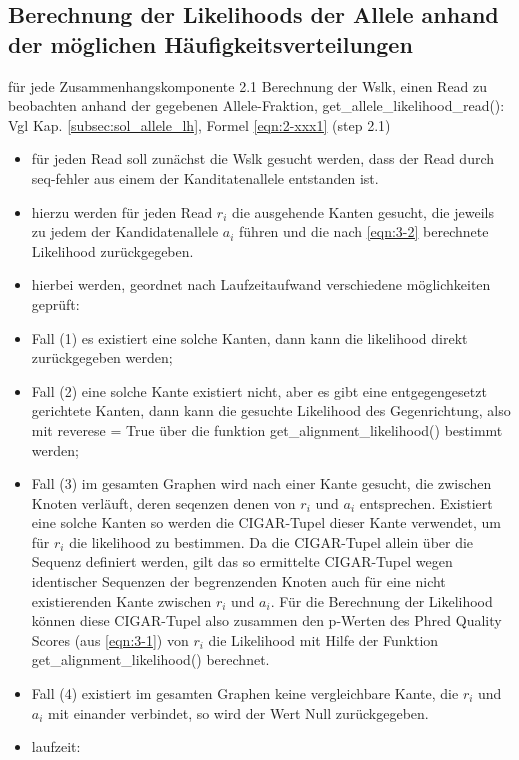\subsection{Berechnung der Likelihoods der Allele anhand der möglichen Häufigkeitsverteilungen} \label{subsec:lh_allele}
für jede Zusammenhangskomponente
2.1 Berechnung der Wslk, einen Read zu beobachten anhand der gegebenen Allele-Fraktion, get\_allele\_likelihood\_read(): Vgl Kap. \ref{subsec:sol_allele_lh}, Formel  \eqref{eqn:2-xxx1} (step 2.1)
\begin{itemize}
	\item für jeden Read soll zunächst die Wslk gesucht werden, dass der Read durch seq-fehler aus einem der Kanditatenallele entstanden ist. 
	\item hierzu werden für jeden Read $ r_{i} $ die ausgehende Kanten gesucht, die jeweils zu jedem der Kandidatenallele $ a_{i} $ führen und die nach \eqref{eqn:3-2} berechnete Likelihood zurückgegeben.
	\item hierbei werden, geordnet nach Laufzeitaufwand verschiedene möglichkeiten geprüft: 
	\item Fall (1) es existiert eine solche Kanten, dann kann die likelihood direkt zurückgegeben werden; 
	\item Fall (2) eine solche Kante existiert nicht, aber es gibt eine entgegengesetzt gerichtete Kanten, dann kann die gesuchte Likelihood des Gegenrichtung, also mit reverese = True über die funktion get\_alignment\_likelihood() bestimmt werden; 
	\item Fall (3) im gesamten Graphen wird nach einer Kante gesucht, die zwischen Knoten verläuft, deren seqenzen denen von $ r_{i} $ und $ a_{i} $ entsprechen. Existiert eine solche Kanten so werden die CIGAR-Tupel dieser Kante verwendet, um für $ r_{i} $ die likelihood zu bestimmen. Da die CIGAR-Tupel allein über die Sequenz definiert werden, gilt das so ermittelte CIGAR-Tupel wegen identischer Sequenzen der begrenzenden Knoten auch für eine nicht existierenden Kante zwischen $ r_{i} $ und $ a_{i} $. Für die Berechnung der Likelihood können diese CIGAR-Tupel also zusammen den p-Werten des Phred Quality Scores (aus \eqref{eqn:3-1}) von $ r_{i} $ die Likelihood mit Hilfe der Funktion get\_alignment\_likelihood() berechnet. 
	\item Fall (4) existiert im gesamten Graphen keine vergleichbare Kante, die $ r_{i} $ und $ a_{i} $ mit einander verbindet, so wird der Wert Null zurückgegeben.
	\item laufzeit:\\	 

\end{itemize}
